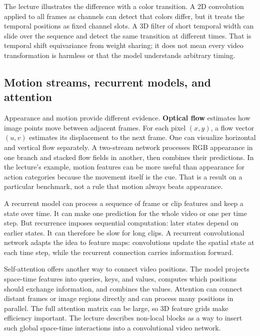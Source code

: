 The lecture illustrates the difference with a color transition. A 2D convolution applied to all frames as channels can detect that colors differ, but it treats the temporal positions as fixed channel slots. A 3D filter of short temporal width can slide over the sequence and detect the same transition at different times. That is temporal shift equivariance from weight sharing; it does not mean every video transformation is harmless or that the model understands arbitrary timing.

\subsection{Motion streams, recurrent models, and attention}\label{04-visual-computing-ii-ch031-motion-streams-recurrent-models-and-attention}

\hypertarget{04-visual-computing-ii-ch031-motion-streams-recurrent-models-and-attention}{}

Appearance and motion provide different evidence. \textbf{Optical flow} estimates how image points move between adjacent frames. For each pixel \((x,y)\), a flow vector \((u,v)\) estimates its displacement to the next frame. One can visualize horizontal and vertical flow separately. A two-stream network processes RGB appearance in one branch and stacked flow fields in another, then combines their predictions. In the lecture's example, motion features can be more useful than appearance for action categories because the movement itself is the cue. That is a result on a particular benchmark, not a rule that motion always beats appearance.

A recurrent model can process a sequence of frame or clip features and keep a state over time. It can make one prediction for the whole video or one per time step. But recurrence imposes sequential computation: later states depend on earlier states. It can therefore be slow for long clips. A recurrent convolutional network adapts the idea to feature maps: convolutions update the spatial state at each time step, while the recurrent connection carries information forward.

Self-attention offers another way to connect video positions. The model projects space-time features into queries, keys, and values, computes which positions should exchange information, and combines the values. Attention can connect distant frames or image regions directly and can process many positions in parallel. The full attention matrix can be large, so 3D feature grids make efficiency important. The lecture describes non-local blocks as a way to insert such global space-time interactions into a convolutional video network.

